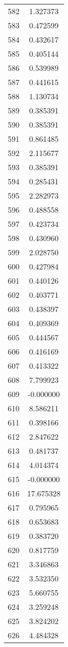 \documentclass[12pt]{article}
\begin{document}
\begin{longtable}{@{}cc@{}}
582 & 1.327373 \\
583 & 0.472599 \\
584 & 0.432617 \\
585 & 0.405144 \\
586 & 0.539989 \\
587 & 0.441615 \\
588 & 1.130734 \\
589 & 0.385391 \\
590 & 0.385391 \\
591 & 0.861485 \\
592 & 2.115677 \\
593 & 0.385391 \\
594 & 0.285431 \\
595 & 2.282973 \\
596 & 0.488558 \\
597 & 0.423734 \\
598 & 0.430960 \\
599 & 2.028750 \\
600 & 0.427984 \\
601 & 0.440126 \\
602 & 0.403771 \\
603 & 0.438397 \\
604 & 0.409369 \\
605 & 0.444567 \\
606 & 0.416169 \\
607 & 0.413322 \\
608 & 7.799923 \\
609 & -0.000000 \\
610 & 8.586211 \\
611 & 0.398166 \\
612 & 2.847622 \\
613 & 0.481737 \\
614 & 4.014374 \\
615 & -0.000000 \\
616 & 17.675328 \\
617 & 0.795965 \\
618 & 0.653683 \\
619 & 0.383720 \\
620 & 0.817759 \\
621 & 3.346863 \\
622 & 3.532350 \\
623 & 5.660755 \\
624 & 3.259248 \\
625 & 3.824202 \\
626 & 4.484328 \\

\end{longtable}
\end{document}
